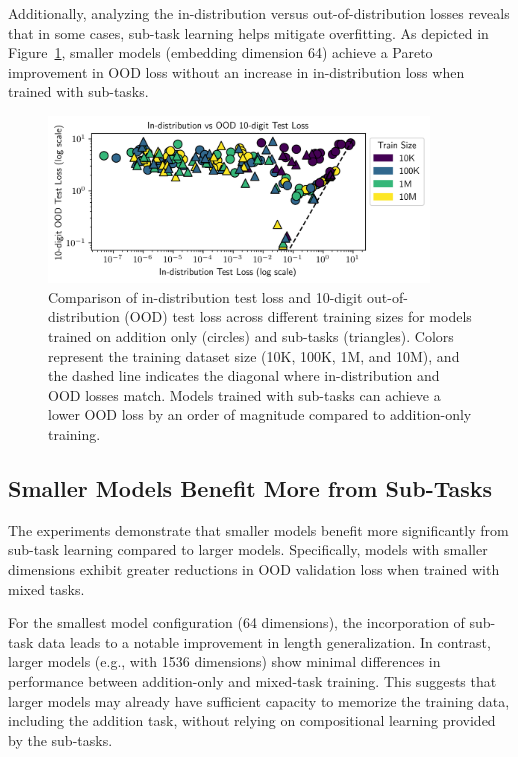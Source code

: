 Additionally, analyzing the in-distribution versus out-of-distribution losses reveals that in some cases, sub-task learning helps mitigate overfitting. As depicted in Figure~\ref{fig:subtask_overfitting}, smaller models (embedding dimension 64) achieve a Pareto improvement in OOD loss without an increase in in-distribution loss when trained with sub-tasks.

\begin{figure}[h!]
    \centering
    \includegraphics[width=0.9\textwidth]{fig/subtask_overfitting.png}
    \caption{Comparison of in-distribution test loss and 10-digit out-of-distribution (OOD) test loss across different training sizes for models trained on addition only (circles) and sub-tasks (triangles). Colors represent the training dataset size (10K, 100K, 1M, and 10M), and the dashed line indicates the diagonal where in-distribution and OOD losses match. Models trained with sub-tasks can achieve a lower OOD loss by an order of magnitude compared to addition-only training.}
    \label{fig:subtask_overfitting}
\end{figure}

\subsection{Smaller Models Benefit More from Sub-Tasks}

The experiments demonstrate that smaller models benefit more significantly from sub-task learning compared to larger models. Specifically, models with smaller dimensions exhibit greater reductions in OOD validation loss when trained with mixed tasks.

For the smallest model configuration (64 dimensions), the incorporation of sub-task data leads to a notable improvement in length generalization. In contrast, larger models (e.g., with 1536 dimensions) show minimal differences in performance between addition-only and mixed-task training. This suggests that larger models may already have sufficient capacity to memorize the training data, including the addition task, without relying on compositional learning provided by the sub-tasks.

